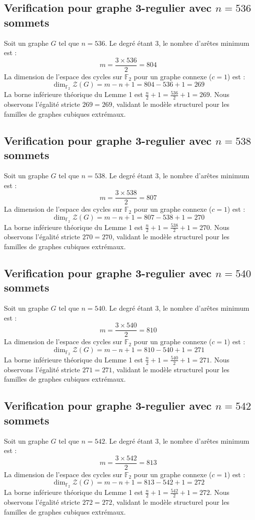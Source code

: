 \documentclass[11pt,a4paper]{article}
\begin{document}
\subsection{Verification pour graphe 3-regulier avec $n=536$ sommets}
Soit un graphe $G$ tel que $n = 536$. Le degré étant 3, le nombre d'arêtes minimum est :
$$ m = \frac{3 \times 536}{2} = 804 $$
La dimension de l'espace des cycles sur $\mathbb{F}_2$ pour un graphe connexe ($c=1$) est :
$$ \dim_{\mathbb{F}_2} \mathcal{Z}(G) = m - n + 1 = 804 - 536 + 1 = 269 $$
La borne inférieure théorique du Lemme 1 est $\frac{n}{2} + 1 = \frac{536}{2} + 1 = 269$.
Nous observons l'égalité stricte $269 = 269$, validant le modèle structurel pour les familles de graphes cubiques extrémaux.

\subsection{Verification pour graphe 3-regulier avec $n=538$ sommets}
Soit un graphe $G$ tel que $n = 538$. Le degré étant 3, le nombre d'arêtes minimum est :
$$ m = \frac{3 \times 538}{2} = 807 $$
La dimension de l'espace des cycles sur $\mathbb{F}_2$ pour un graphe connexe ($c=1$) est :
$$ \dim_{\mathbb{F}_2} \mathcal{Z}(G) = m - n + 1 = 807 - 538 + 1 = 270 $$
La borne inférieure théorique du Lemme 1 est $\frac{n}{2} + 1 = \frac{538}{2} + 1 = 270$.
Nous observons l'égalité stricte $270 = 270$, validant le modèle structurel pour les familles de graphes cubiques extrémaux.

\subsection{Verification pour graphe 3-regulier avec $n=540$ sommets}
Soit un graphe $G$ tel que $n = 540$. Le degré étant 3, le nombre d'arêtes minimum est :
$$ m = \frac{3 \times 540}{2} = 810 $$
La dimension de l'espace des cycles sur $\mathbb{F}_2$ pour un graphe connexe ($c=1$) est :
$$ \dim_{\mathbb{F}_2} \mathcal{Z}(G) = m - n + 1 = 810 - 540 + 1 = 271 $$
La borne inférieure théorique du Lemme 1 est $\frac{n}{2} + 1 = \frac{540}{2} + 1 = 271$.
Nous observons l'égalité stricte $271 = 271$, validant le modèle structurel pour les familles de graphes cubiques extrémaux.

\subsection{Verification pour graphe 3-regulier avec $n=542$ sommets}
Soit un graphe $G$ tel que $n = 542$. Le degré étant 3, le nombre d'arêtes minimum est :
$$ m = \frac{3 \times 542}{2} = 813 $$
La dimension de l'espace des cycles sur $\mathbb{F}_2$ pour un graphe connexe ($c=1$) est :
$$ \dim_{\mathbb{F}_2} \mathcal{Z}(G) = m - n + 1 = 813 - 542 + 1 = 272 $$
La borne inférieure théorique du Lemme 1 est $\frac{n}{2} + 1 = \frac{542}{2} + 1 = 272$.
Nous observons l'égalité stricte $272 = 272$, validant le modèle structurel pour les familles de graphes cubiques extrémaux.
\end{document}

